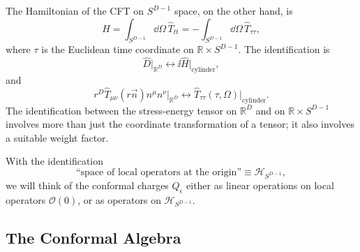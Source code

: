 The Hamiltonian of the CFT on \(S^{D-1}\) space, on the other hand, is
\[
  \widehat H
  =
  \int_{S^{D-1}}\dd\Omega\,\widehat T_{tt}
  =
  -\int_{S^{D-1}}\dd\Omega\,\widehat T_{\tau\tau},
\]
where \(\tau\) is the Euclidean time coordinate on
\(\mathbb R\times S^{D-1}\).  The identification is
\[
  \widehat D\big|_{\mathbb R^D}
  \longleftrightarrow
  \ii\widehat H\big|_{\text{cylinder}},
\]
and
\[
  r^D\widehat T_{\mu\nu}(r\vec n)n^\mu n^\nu\big|_{\mathbb R^D}
  \longleftrightarrow
  \widehat T_{\tau\tau}(\tau,\Omega)\big|_{\text{cylinder}}.
\]
The identification between the stress-energy tensor on \(\mathbb R^D\)
and on \(\mathbb R\times S^{D-1}\) involves more than just the coordinate
transformation of a tensor; it also involves a suitable weight factor.

With the identification
\[
  \text{``space of local operators at the origin''}
  \equiv
  \mathcal H_{S^{D-1}},
\]
we will think of the conformal charges \(Q_\epsilon\) either as linear
operations on local operators \(\mathcal O(0)\), or as operators on
\(\mathcal H_{S^{D-1}}\).

\subsection{The Conformal Algebra}

